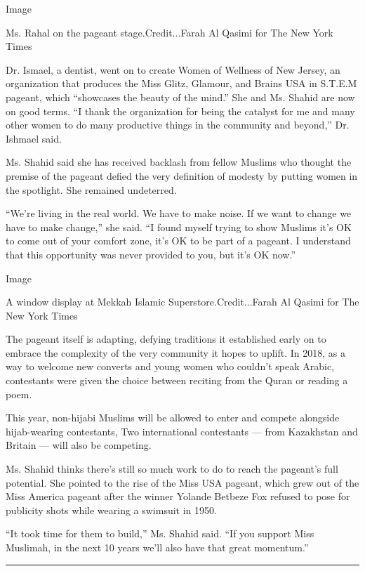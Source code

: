 Image

Ms. Rahal on the pageant stage.Credit...Farah Al Qasimi for The New York
Times

Dr. Ismael, a dentist, went on to create Women of Wellness of New
Jersey, an organization that produces the Miss Glitz, Glamour, and
Brains USA in S.T.E.M pageant, which ``showcases the beauty of the
mind.'' She and Ms. Shahid are now on good terms. ``I thank the
organization for being the catalyst for me and many other women to do
many productive things in the community and beyond,'' Dr. Ishmael said.

Ms. Shahid said she has received backlash from fellow Muslims who
thought the premise of the pageant defied the very definition of modesty
by putting women in the spotlight. She remained undeterred.

``We're living in the real world. We have to make noise. If we want to
change we have to make change,'' she said. ``I found myself trying to
show Muslims it's OK to come out of your comfort zone, it's OK to be
part of a pageant. I understand that this opportunity was never provided
to you, but it's OK now.''

Image

A window display at Mekkah Islamic Superstore.Credit...Farah Al Qasimi
for The New York Times

The pageant itself is adapting, defying traditions it established early
on to embrace the complexity of the very community it hopes to uplift.
In 2018, as a way to welcome new converts and young women who couldn't
speak Arabic, contestants were given the choice between reciting from
the Quran or reading a poem.

This year, non-hijabi Muslims will be allowed to enter and compete
alongside hijab-wearing contestants, Two international contestants ---
from Kazakhstan and Britain --- will also be competing.

Ms. Shahid thinks there's still so much work to do to reach the
pageant's full potential. She pointed to the rise of the Miss USA
pageant, which grew out of the Miss America pageant after the winner
Yolande Betbeze Fox refused to pose for publicity shots while wearing a
swimsuit in 1950.

``It took time for them to build,'' Ms. Shahid said. ``If you support
Miss Muslimah, in the next 10 years we'll also have that great
momentum.''

\begin{center}\rule{0.5\linewidth}{\linethickness}\end{center}

